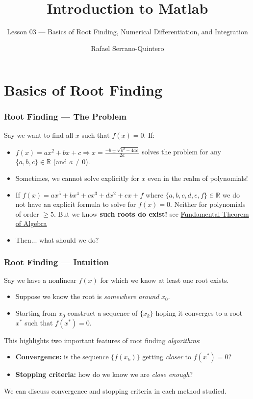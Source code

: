 \documentclass[11pt,xcolor={svgnames},aspectratio=169,usepdftitle=false,notheorems]{beamer}
\title{Introduction to Matlab}
\subtitle{Lesson 03 --- Basics of Root Finding, Numerical Differentiation, and Integration}
\author{Rafael Serrano-Quintero}
\institute{Department of Economics \\ University of Barcelona}
\date{}
\begin{document}
\VerbatimFootnotes

\maketitle

\section{Basics of Root Finding}

\begin{frame}
  \frametitle{Root Finding --- The Problem}
Say we want to find all $x$ such that $f(x) = 0$. If:
\begin{itemize}
  \item $f(x) = ax^2 + bx + c \Rightarrow x = \frac{-b \pm \sqrt{b^2 - 4ac}}{2a}$ solves the problem for any $\{a,b,c\}\in\mathbb{R}$ {\tiny (and $a\neq 0$)}.
  \item Sometimes, we cannot solve explicitly for $x$ even in the realm of polynomials!
  \item If $f(x) = ax^5 + bx^4 + cx^3 + dx^2 + ex + f$ where $\{a,b,c,d,e,f\}\in\mathbb{R}$ we do not have an explicit formula to solve for $f(x) = 0$. Neither for polynomials of order $\geq 5$. But we know \alert{\textbf{such roots do exist!}} {\tiny see \href{https://en.wikipedia.org/wiki/Fundamental_theorem_of_algebra}{Fundamental Theorem of Algebra}}
  \item Then... what should we do?
\end{itemize}
\end{frame}

\begin{frame}
  \frametitle{Root Finding --- Intuition}
Say we have a nonlinear $f(x)$ for which we know at least one root exists.
\begin{itemize}
  \item Suppose we know the root is \textit{somewhere around} $x_0$.
  \item Starting from $x_0$ construct a sequence of $\{x_k\}$ hoping it converges to a root $x^*$ such that $f(x^*) = 0$.
\end{itemize}
This highlights two important features of root finding \textit{algorithms}:
\begin{itemize}
  \item \alert{\textbf{Convergence:}} is the sequence $\{f(x_k)\}$ getting \textit{closer} to $f(x^*) = 0$?
  \item \alert{\textbf{Stopping criteria:}} how do we know we are \textit{close enough}?
\end{itemize}
We can discuss convergence and stopping criteria in each method studied.
\end{frame}
\end{document}
